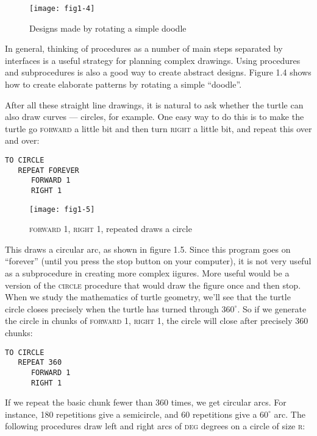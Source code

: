 \documentclass{book}
\begin{document}
\begin{figure}
\begin{center}
\texttt{[image: fig1-4]}
\caption{Designs made by rotating a simple doodle}
\end{center}
\end{figure}


In general, thinking of procedures as a number of main steps separated by interfaces is a useful strategy for planning complex drawings. Using procedures and subprocedures is also a good way to create abstract designs. Figure 1.4 shows how to create elaborate patterns by rotating a simple ``doodle''.

After all these straight line drawings, it is natural to ask whether the turtle can also draw curves --- circles, for example. One easy way to do this is to make the turtle go \textsc{forward} a little bit and then turn \textsc{right} a little bit, and repeat this over and over:

\begin{verbatim}
TO CIRCLE
   REPEAT FOREVER
      FORWARD 1
      RIGHT 1
\end{verbatim}
\begin{figure}
\begin{center}
\texttt{[image: fig1-5]}
\caption{\textsc{forward} 1, \textsc{right} 1, repeated draws a circle}
\end{center}
\end{figure}

This draws a circular arc, as shown in figure 1.5. Since this program
goes on ``forever'' (until you press the stop button on your computer), it
is not very useful as a subprocedure in creating more complex iigures.
More useful would be a version of the \textsc{circle} procedure that would
draw the figure once and then stop. When we study the mathematics of
turtle geometry, we'll see that the turtle circle closes precisely when the
turtle has turned through $360^{\circ}$. So if we generate the circle in chunks
of \textsc{forward} 1, \textsc{right} 1, the circle will close after 
precisely 360 chunks:

\begin{verbatim}
TO CIRCLE
   REPEAT 360
      FORWARD 1
      RIGHT 1
\end{verbatim}
If we repeat the basic chunk fewer than 360 times, we get circular arcs.
For instance, 180 repetitions give a semicircle, and 60 repetitions give a
$60^{\circ}$ arc. The following procedures draw left and right arcs of \textsc{deg} degrees
on a circle of size \textsc{r}:
\end{document}
